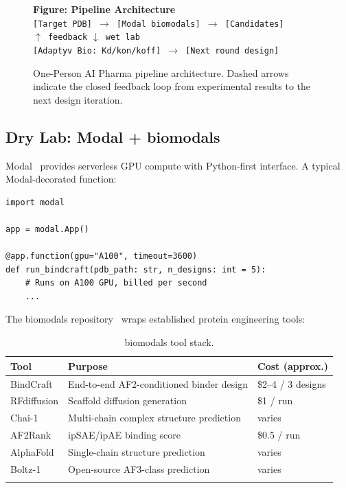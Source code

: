 \documentclass[12pt,a4paper]{article}
\begin{document}
\begin{figure}[htbp]
  \begin{tcolorbox}[colback=gray!5, colframe=gray!30, box align=center]
    \textbf{Figure: Pipeline Architecture} \\
    \smallskip
    \texttt{[Target PDB] $\rightarrow$ [Modal biomodals] $\rightarrow$ [Candidates]} \\
    \vspace{0.3em}
    \texttt{$\uparrow$ feedback} \hspace{2em} \texttt{$\downarrow$ wet lab} \\
    \vspace{0.3em}
    \texttt{[Adaptyv Bio: Kd/kon/koff] $\rightarrow$ [Next round design]}
  \end{tcolorbox}
  \caption{One-Person AI Pharma pipeline architecture. Dashed arrows indicate
    the closed feedback loop from experimental results to the next design
    iteration.}
  \label{fig:pipeline}
\end{figure}

\subsection{Dry Lab: Modal + biomodals}

Modal~\citep{modal} provides serverless GPU compute with Python-first
interface. A typical Modal-decorated function:

\begin{lstlisting}
import modal

app = modal.App()

@app.function(gpu="A100", timeout=3600)
def run_bindcraft(pdb_path: str, n_designs: int = 5):
    # Runs on A100 GPU, billed per second
    ...
\end{lstlisting}

The biomodals repository~\citep{biomodals} wraps established protein engineering
tools:

\begin{longtable}[]{@{}lll@{}}
  \toprule
  Tool & Purpose & Cost (approx.) \\
  \midrule
  BindCraft & End-to-end AF2-conditioned binder design & \$2--4 / 3 designs \\
  RFdiffusion & Scaffold diffusion generation & \$1 / run \\
  Chai-1 & Multi-chain complex structure prediction & varies \\
  AF2Rank & ipSAE/ipAE binding score & \$0.5 / run \\
  AlphaFold & Single-chain structure prediction & varies \\
  Boltz-1 & Open-source AF3-class prediction & varies \\
  \bottomrule
  \caption{biomodals tool stack.}
  \label{tab:biomodals}
\end{longtable}
\end{document}
